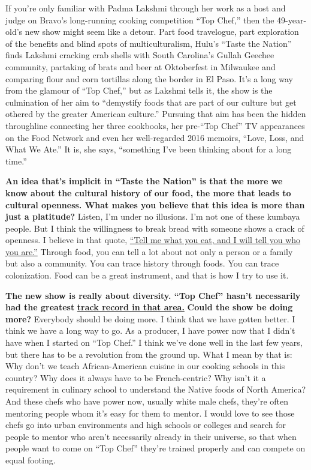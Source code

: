 If you're only familiar with Padma Lakshmi through her work as a host
and judge on Bravo's long-running cooking competition ``Top Chef,'' then
the 49-year-old's new show might seem like a detour. Part food
travelogue, part exploration of the benefits and blind spots of
multiculturalism, Hulu's ``Taste the Nation'' finds Lakshmi cracking
crab shells with South Carolina's Gullah Geechee community, partaking of
brats and beer at Oktoberfest in Milwaukee and comparing flour and corn
tortillas along the border in El Paso. It's a long way from the glamour
of ``Top Chef,'' but as Lakshmi tells it, the show is the culmination of
her aim to ``demystify foods that are part of our culture but get
othered by the greater American culture.'' Pursuing that aim has been
the hidden throughline connecting her three cookbooks, her pre-``Top
Chef'' TV appearances on the Food Network and even her well-regarded
2016 memoirs, ``Love, Loss, and What We Ate.'' It is, she says,
``something I've been thinking about for a long time.''

\textbf{An idea that's implicit in ``Taste the Nation'' is that the more
we know about the cultural history of our food, the more that leads to
cultural openness. What makes you believe that this idea is more than
just a platitude?} Listen, I'm under no illusions. I'm not one of these
kumbaya people. But I think the willingness to break bread with someone
shows a crack of openness. I believe in that quote,
\href{http://nytimes.com\#tooltip-1}{``Tell me what you eat, and I will
tell you who you are.''} Through food, you can tell a lot about not only
a person or a family but also a community. You can trace history through
foods. You can trace colonization. Food can be a great instrument, and
that is how I try to use it.

\textbf{The new show is really about diversity. ``Top Chef'' hasn't
necessarily had the greatest}
\textbf{\href{http://nytimes.com\#tooltip-2}{track record in that
area.}} \textbf{Could the show be doing more?} Everybody should be doing
more. I think that we have gotten better. I think we have a long way to
go. As a producer, I have power now that I didn't have when I started on
``Top Chef.'' I think we've done well in the last few years, but there
has to be a revolution from the ground up. What I mean by that is: Why
don't we teach African-American cuisine in our cooking schools in this
country? Why does it always have to be French-centric? Why isn't it a
requirement in culinary school to understand the Native foods of North
America? And these chefs who have power now, usually white male chefs,
they're often mentoring people whom it's easy for them to mentor. I
would love to see those chefs go into urban environments and high
schools or colleges and search for people to mentor who aren't
necessarily already in their universe, so that when people want to come
on ``Top Chef'' they're trained properly and can compete on equal
footing.

